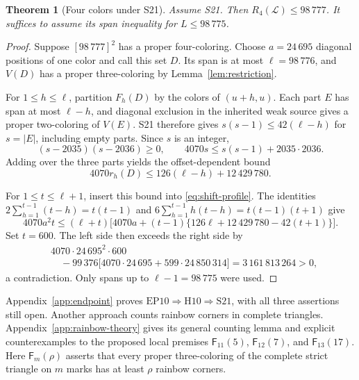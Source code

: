 \documentclass[11pt,a4paper]{article}
\newtheorem{theorem}{Theorem}[section]
\theoremstyle{definition}
\newcommand{\Lconf}{\mathcal L}
\newcommand{\F}{\mathsf F}
\numberwithin{equation}{section}
\begin{document}
\begin{theorem}[Four colors under S21]\label{thm:s21four}
Assume S21. Then $R_4(\Lconf)\le98\,777$. It suffices to assume its span inequality for $L\le98\,775$.
\end{theorem}
\begin{proof}
Suppose $[98\,777]^2$ has a proper four-coloring. Choose $a=24\,695$ diagonal positions of one color and call this set $D$. Its span is at most $\ell=98\,776$, and $V(D)$ has a proper three-coloring by Lemma~\ref{lem:restriction}.

For $1\le h\le\ell$, partition $F_h(D)$ by the colors of $(u+h,u)$. Each part $E$ has span at most $\ell-h$, and diagonal exclusion in the inherited weak source gives a proper two-coloring of $V(E)$. S21 therefore gives $s(s-1)\le42(\ell-h)$ for $s=|E|$, including empty parts. Since $s$ is an integer,
\[
(s-2035)(s-2036)\ge0,
\qquad 4070s\le s(s-1)+2035\cdot2036.
\]
Adding over the three parts yields the offset-dependent bound
\begin{equation}\label{eq:four-color-profile}
4070r_h(D)\le126(\ell-h)+12\,429\,780.
\end{equation}

For $1\le t\le\ell+1$, insert this bound into \eqref{eq:shift-profile}. The identities
$2\sum_{h=1}^{t-1}(t-h)=t(t-1)$ and
$6\sum_{h=1}^{t-1}h(t-h)=t(t-1)(t+1)$ give
\[
4070a^2t\le(\ell+t)\bigl[4070a+(t-1)\{126\ell+12\,429\,780-42(t+1)\}\bigr].
\]
Set $t=600$. The left side then exceeds the right side by
\begin{equation}\label{eq:four-color-gap}
\begin{aligned}
&4070\cdot24\,695^2\cdot600\\
&\quad-99\,376\bigl[4070\cdot24\,695+599\cdot24\,850\,314\bigr]
=3\,161\,813\,264>0,
\end{aligned}
\end{equation}
a contradiction. Only spans up to $\ell-1=98\,775$ were used.
\end{proof}

Appendix~\ref{app:endpoint} proves $\mathrm{EP10}\Rightarrow\mathrm{H10}\Rightarrow\mathrm{S21}$, with all three assertions still open. Another approach counts rainbow corners in complete triangles. Appendix~\ref{app:rainbow-theory} gives its general counting lemma and explicit counterexamples to the proposed local premises $\F_{11}(5)$, $\F_{12}(7)$, and $\F_{13}(17)$. Here $\F_m(\rho)$ asserts that every proper three-coloring of the complete strict triangle on $m$ marks has at least $\rho$ rainbow corners.
\end{document}
